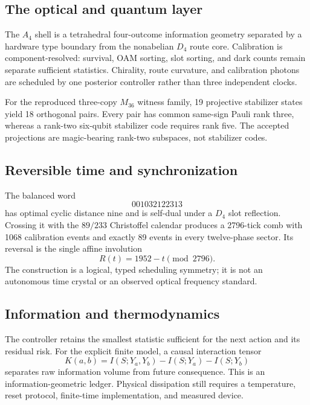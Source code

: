 \subsection*{The optical and quantum layer}
The \(A_4\) shell is a tetrahedral four-outcome information geometry separated by a
hardware type boundary from the nonabelian \(D_4\) route core.  Calibration is
component-resolved: survival, OAM sorting, slot sorting, and dark counts remain
separate sufficient statistics.  Chirality, route curvature, and calibration photons
are scheduled by one posterior controller rather than three independent clocks.

For the reproduced three-copy \(M_{36}\) witness family, 19 projective stabilizer
states yield 18 orthogonal pairs.  Every pair has common same-sign Pauli rank three,
whereas a rank-two six-qubit stabilizer code requires rank five.  The accepted
projections are magic-bearing rank-two subspaces, not stabilizer codes.

\subsection*{Reversible time and synchronization}
The balanced word
\[
  001032122313
\]
has optimal cyclic distance nine and is self-dual under a \(D_4\) slot reflection.
Crossing it with the \(89/233\) Christoffel calendar produces a 2796-tick comb with
1068 calibration events and exactly 89 events in every twelve-phase sector.  Its
reversal is the single affine involution
\[
  R(t)=1952-t\pmod{2796}.
\]
The construction is a logical, typed scheduling symmetry; it is not an autonomous
time crystal or an observed optical frequency standard.

\subsection*{Information and thermodynamics}
The controller retains the smallest statistic sufficient for the next action and its
residual risk.  For the explicit finite model, a causal interaction tensor
\[
 K(a,b)=I(S;Y_a,Y_b)-I(S;Y_a)-I(S;Y_b)
\]
separates raw information volume from future consequence.  This is an
information-geometric ledger.  Physical dissipation still requires a temperature,
reset protocol, finite-time implementation, and measured device.

